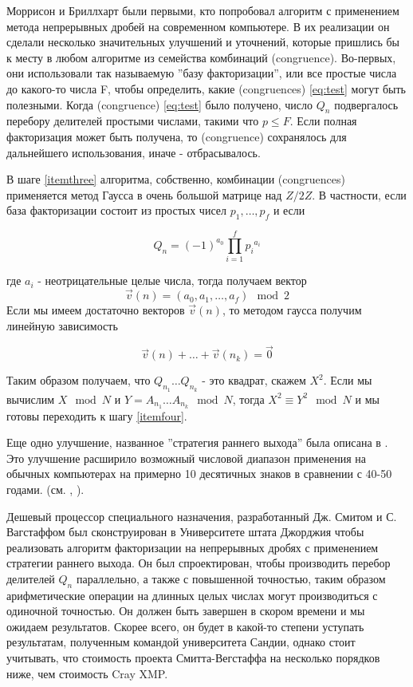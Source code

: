 \documentclass[russian, utf8, a4paper,12pt]{report}
\begin{document}
Моррисон и Бриллхарт \cite{morris} были первыми, кто попробовал алгоритм с применением метода непрерывных дробей на современном компьютере. В их реализации он сделали несколько значительных улучшений и уточнений, которые пришлись бы к месту в любом алгоритме из семейства комбинаций (congruence). Во-первых, они использовали так называемую ''базу факторизации'', или все простые числа до какого-то числа F, чтобы определить, какие (congruences) \eqref{eq:test} могут быть полезными. Когда (congruence) \eqref{eq:test} было получено, число $Q_{n}$ подвергалось перебору делителей  простыми числами, такими что $p \leq F$. Если полная факторизация может быть получена, то (congruence) сохранялось для дальнейшего использования, иначе - отбрасывалось.

В шаге \ref{itemthree} алгоритма, собственно, комбинации (congruences) применяется метод Гаусса в очень большой матрице над $Z/2Z$. В частности, если база факторизации состоит из простых чисел $p_1, \ldots, p_f$ и если 

\begin{equation*}
Q_{n} = {(-1)}^{a_0} \prod_{i = 1}^{f} {p_i}^{a_i}
\end{equation*}  

где $a_i$ - неотрицательные целые числа, тогда получаем вектор 
\begin{equation*}
\vec{v}(n) = (a_0, a_1, \ldots, a_f) \mod 2
\end{equation*}
Если мы имеем достаточно векторов $\vec{v}(n)$, то методом гаусса получим линейную зависимость

\begin{equation*}
\vec{v}(n) + \ldots + \vec{v}(n_k) = \vec{0}
\end{equation*}

Таким образом получаем, что $Q_{n_1} \ldots Q_{n_k}$ - это квадрат, скажем $X^2$. Если мы вычислим $X \mod{N}$ и $Y = A_{n_1} \ldots A_{n_k} \mod N$, тогда $X^2 \equiv Y^2 \mod N$ и мы готовы переходить к шагу \ref{itemfour}.

Еще одно улучшение, названное ''стратегия раннего выхода'' была описана в \cite{pomer}. Это улучшение расширило возможный числовой диапазон применения на обычных компьютерах на примерно 10 десятичных знаков в сравнении с 40-50 годами. (см. \cite{wunder}, \cite{wags}).

Дешевый процессор специального назначения, разработанный Дж. Смитом и С. Вагстаффом был сконструирован в Университете штата Джорджия чтобы реализовать алгоритм факторизации на непрерывных дробях с применением стратегии раннего выхода. Он был спроектирован, чтобы производить перебор делителей $Q_n$ параллельно, а также с повышенной точностью, таким образом арифметические операции на длинных целых числах могут производиться с одиночной точностью. Он должен быть завершен в скором времени и мы ожидаем результатов. Скорее всего, он будет в какой-то степени уступать результатам, полученным командой университета Сандии, однако стоит учитывать, что стоимость проекта Смитта-Вегстаффа на несколько порядков ниже, чем стоимость Cray XMP.
\end{document}
